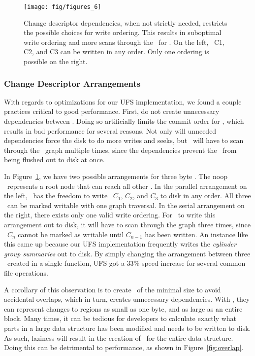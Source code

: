 \begin{figure}[htb]
  \centering
  \texttt{[image: fig/figures\_6]}
  \caption{\label{fig:chdescarrange} Change descriptor dependencies, when
  not strictly needed, restricts the possible choices for write ordering.
  This results in suboptimal write ordering and more scans through the
  \chdescs\ for \Kudos. On the left, \chdescs\ C1, C2, and C3 can be written
  in any order. Only one ordering is possible on the right.}
\end{figure}

\subsubsection {Change Descriptor Arrangements}
With regards to optimizations for our UFS implementation, we found a couple
practices critical to good performance. First, do not create unnecessary
dependencies between \chdescs. Doing so artificially limits the commit order
for \chdescs, which results in bad performance for several reasons. Not only
will unneeded dependencies force the disk to do more writes and seeks, but
\Kudos\ will have to scan through the \chdesc\ graph multiple times, since the
dependencies prevent the \chdescs\ from being flushed out to disk at once.

In Figure~\ref{fig:chdescarrange}, we have two possible arrangements for three
byte \chdescs. The noop \chdesc\ represents a root node that can reach all
other \chdescs. In the parallel arrangement on the left, \Kudos\ has the
freedom to write \chdescs\ $C_1$, $C_2$, and $C_3$ to disk in any order. All
three \chdescs\ can be marked writable with one graph traversal. In the serial
arrangement on the right, there exists only one valid write ordering. For
\Kudos\ to write this arrangement out to disk, it will have to scan through
the graph three times, since \chdesc\ $C_n$ cannot be marked as writable until
$C_{n-1}$ has been written.
An instance like this came up because our UFS implementation frequently writes
the \emph{cylinder group summaries} out to disk. By simply changing the
arrangement between three \chdescs\ created in a single function, UFS got a
33\% speed increase for several common file operations.

A corollary of this observation is to create \chdescs\ of the minimal size
to avoid accidental overlaps, which in turn, creates unnecessary dependencies.
With \chdescs, they can represent changes to regions as small as one byte, and
as large as an entire block. Many times, it can be tedious for developers
to calculate exactly what parts in a large data structure has been modified and
needs to be written to disk. As such, laziness will result in the creation of
\chdescs\ for the entire data structure. Doing this can be detrimental to
performance, as shown in Figure~\ref{fig:overlap}.

